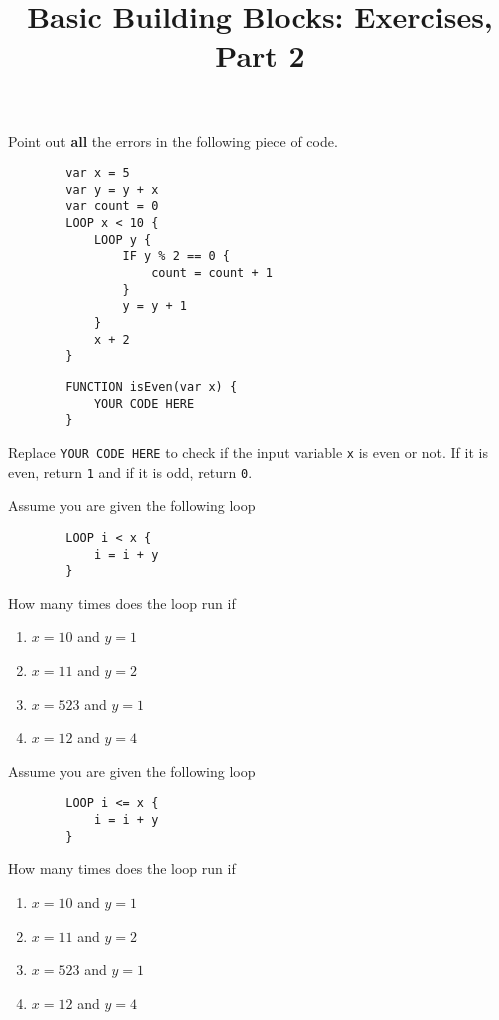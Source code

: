 \documentclass{article}
\title{Basic Building Blocks: Exercises, Part 2}
\begin{document}
\maketitle

\begin{Exercise}

    Point out \textbf{all} the errors in the following piece of code.

    \begin{lstlisting}
        var x = 5
        var y = y + x
        var count = 0
        LOOP x < 10 {
            LOOP y {
                IF y % 2 == 0 {
                    count = count + 1
                }
                y = y + 1
            }
            x + 2
        }
    \end{lstlisting}

\end{Exercise}

\begin{Exercise}
    \begin{lstlisting}
        FUNCTION isEven(var x) {
            YOUR CODE HERE
        }
    \end{lstlisting}

    Replace \lstinline{YOUR CODE HERE} to check if the input variable \lstinline{x} is even or not.
    If it is even, return \lstinline{1} and if it is odd, return \lstinline{0}.
\end{Exercise}

\begin{Exercise}

    Assume you are given the following loop
    \begin{lstlisting}
        LOOP i < x {
            i = i + y
        }
    \end{lstlisting}

    How many times does the loop run if
    \begin{enumerate}
    \item $x = 10$ and $y = 1$
    \item $x = 11$ and $y = 2$
    \item $x = 523$ and $y = 1$
    \item $x = 12$ and $y = 4$
    \end{enumerate}
\end{Exercise}

\begin{Exercise}

    Assume you are given the following loop
    \begin{lstlisting}
        LOOP i <= x {
            i = i + y
        }
    \end{lstlisting}

    How many times does the loop run if
    \begin{enumerate}
    \item $x = 10$ and $y = 1$
    \item $x = 11$ and $y = 2$
    \item $x = 523$ and $y = 1$
    \item $x = 12$ and $y = 4$
    \end{enumerate}
\end{Exercise}
\end{document}
